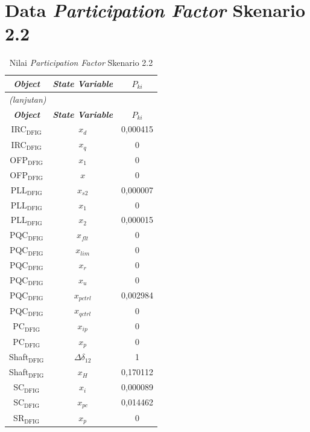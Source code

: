 \section{Data \textit{Participation Factor} Skenario 2.2}
\begingroup
\fontsize{12}{14.4}\selectfont
\setlength{\tabcolsep}{8pt}
\begin{longtable}{c c c} \caption[]{Nilai
	\textit{Participation Factor} Skenario 2.2} \label{tab:prf_sk22_lampiran} \\
	\toprule
	\multicolumn{1}{c}{\textbf{\textit{Object}}} & \textbf{\textit{State
	Variable}} & \textbf{$P_{ki}$} \\
	\midrule
	\endfirsthead
	\multicolumn{3}{l}{\textit{(lanjutan)}} \\
	\toprule
	\multicolumn{1}{c}{\textbf{\textit{Object}}} & \textbf{\textit{State
	Variable}} & \textbf{$P_{ki}$} \\
	\midrule
	\endhead
	\bottomrule
	\endfoot
	IRC$_\text{DFIG}$ & $x_d$ & 0,000415 \\
	IRC$_\text{DFIG}$ & $x_q$ & 0        \\
	OFP$_\text{DFIG}$ & $x_1$ & 0        \\
	OFP$_\text{DFIG}$ & $x$ & 0        \\
	PLL$_\text{DFIG}$ & $x_{s2}$ & 0,000007 \\
	PLL$_\text{DFIG}$ & $x_1$ & 0        \\
	PLL$_\text{DFIG}$ & $x_2$ & 0,000015 \\
	PQC$_\text{DFIG}$ & $x_{flt}$ & 0        \\
	PQC$_\text{DFIG}$ & $x_{lim}$ & 0        \\
	PQC$_\text{DFIG}$ & $x_r$ & 0        \\
	PQC$_\text{DFIG}$ & $x_u$ & 0        \\
	PQC$_\text{DFIG}$ & $x_{pctrl}$ & 0,002984 \\
	PQC$_\text{DFIG}$ & $x_{qctrl}$ & 0        \\
	PC$_\text{DFIG}$ & $x_{ip}$ & 0        \\
	PC$_\text{DFIG}$ & $x_p$ & 0        \\
	Shaft$_\text{DFIG}$ & $\Delta\delta_{12}$ & 1        \\
	Shaft$_\text{DFIG}$ & $x_H$ & 0,170112 \\
	SC$_\text{DFIG}$ & $x_i$ & 0,000089 \\
	SC$_\text{DFIG}$ & $x_{pc}$ & 0,014462 \\
	SR$_\text{DFIG}$ & $x_p$ & 0        \\

\end{longtable}
